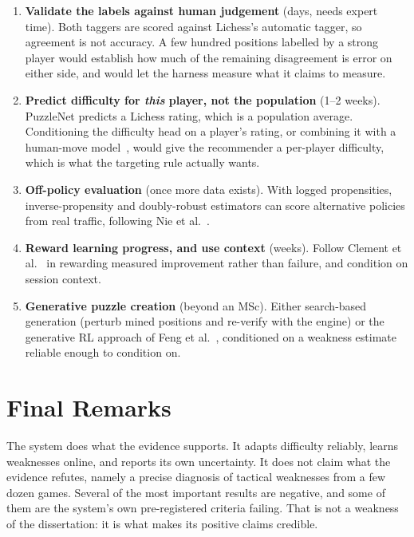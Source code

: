 \begin{enumerate}
        replacing, and the data-scaling curve in Section~\ref{sec:nn-ablations} says whether more capacity
        or more data is the binding constraint.
  \item \textbf{Validate the labels against human judgement} (days, needs expert time). Both taggers are
        scored against Lichess's automatic tagger, so agreement is not accuracy. A few hundred positions
        labelled by a strong player would establish how much of the remaining disagreement is error on
        either side, and would let the harness measure what it claims to measure.
  \item \textbf{Predict difficulty for \emph{this} player, not the population} (1--2 weeks). PuzzleNet
        predicts a Lichess rating, which is a population average. Conditioning the difficulty head on a
        player's rating, or combining it with a human-move model~\cite{mcilroyyoung2020aligning}, would give
        the recommender a per-player difficulty, which is what the targeting rule actually wants.
  \item \textbf{Off-policy evaluation} (once more data exists). With logged propensities,
        inverse-propensity and doubly-robust estimators can score alternative policies from real
        traffic, following Nie et al.~\cite{nie2026discovering}.
  \item \textbf{Reward learning progress, and use context} (weeks). Follow Clement et
        al.~\cite{clement2015multi} in rewarding measured improvement rather than failure, and condition
        on session context.
  \item \textbf{Generative puzzle creation} (beyond an MSc). Either search-based generation (perturb
        mined positions and re-verify with the engine) or the generative RL approach of Feng et
        al.~\cite{feng2025generating}, conditioned on a weakness estimate reliable enough to condition on.
\end{enumerate}

\section{Final Remarks}

The system does what the evidence supports. It adapts difficulty reliably, learns weaknesses online,
and reports its own uncertainty. It does not claim what the evidence refutes, namely a precise diagnosis
of tactical weaknesses from a few dozen games. Several of the most important results are negative, and
some of them are the system's own pre-registered criteria failing. That is not a weakness of the
dissertation: it is what makes its positive claims credible.

